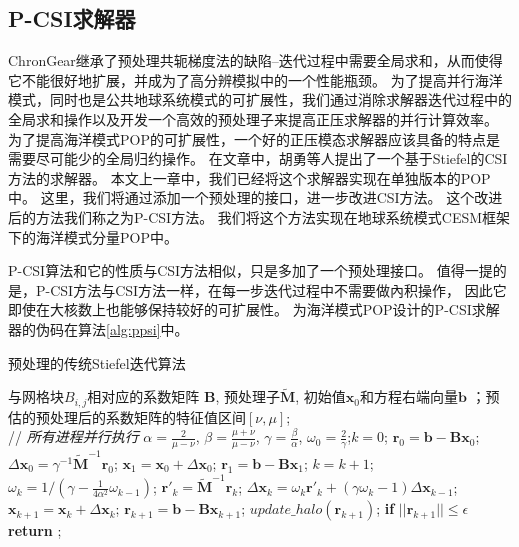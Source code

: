 \subsection{P-CSI求解器}
\label{precond:pcsi}
ChronGear继承了预处理共轭梯度法的缺陷--迭代过程中需要全局求和，从而使得它不能很好地扩展，并成为了高分辨模拟中的一个性能瓶颈。
为了提高并行海洋模式，同时也是公共地球系统模式的可扩展性，我们通过消除求解器迭代过程中的全局求和操作以及开发一个高效的预处理子来提高正压求解器的并行计算效率。
为了提高海洋模式POP的可扩展性，一个好的正压模态求解器应该具备的特点是需要尽可能少的全局归约操作。 
在文章\cite{hu2013scalable}中，胡勇等人提出了一个基于Stiefel的CSI方法的求解器。
本文上一章中，我们已经将这个求解器实现在单独版本的POP中。 
这里，我们将通过添加一个预处理的接口，进一步改进CSI方法。
这个改进后的方法我们称之为P-CSI方法。 我们将这个方法实现在地球系统模式CESM框架下的海洋模式分量POP中。 

P-CSI算法和它的性质与CSI方法相似，只是多加了一个预处理接口。 
值得一提的是，P-CSI方法与CSI方法一样，在每一步迭代过程中不需要做內积操作， 因此它即使在大核数上也能够保持较好的可扩展性。
为海洋模式POP设计的P-CSI求解器的伪码在算法\ref{alg:ppsi}中。

\begin{algorithm}[!t]
\caption{ 预处理的传统Stiefel迭代算法}
\label{alg:ppsi}
\begin{algorithmic}[1]
\REQUIRE 与网格块$B_{i,j}$相对应的系数矩阵 $\textbf{B}$, 预处理子$\tilde{\textbf{M}}$, 初始值$\textbf{x}_0$和方程右端向量$\textbf{b}$ ；预估的预处理后的系数矩阵的特征值区间$[\nu,\mu]$;  \\
 // \qquad    \textit{所有进程并行执行}
\STATE $\alpha =\frac{2}{\mu -\nu}$, $ \beta = \frac{\mu +\nu}{\mu -\nu}$, $\gamma = \frac{\beta}{\alpha}$, $\omega_0 =\frac{ 2}{\gamma}$;\quad $k = 0$;
\STATE $\textbf{r}_0 = \textbf{b}-\textbf{B}\textbf{x}_0$; $\Delta \textbf{x}_{0} = \gamma^{-1}\tilde{\textbf{M}}^{-1}\textbf{r}_0$; $\textbf{x}_1 =\textbf{x}_0 +\Delta \textbf{x}_{0}$; $\textbf{r}_1 =\textbf{b} -\textbf{B}\textbf{x}_1$;
\STATE $k=k+1$;
\STATE $\omega_k = 1/(\gamma - \frac{1}{4\alpha^2}\omega_{k-1})$; 
\STATE $\textbf{r}'_{k} =\tilde{\textbf{M}}^{-1}\textbf{r}_{k}$; \label{alg:ppsi_pre}  
\STATE $\Delta \textbf{x}_{k} =\omega_k\textbf{r}'_{k}+(\gamma \omega_k-1)\Delta \textbf{x}_{k-1}$;
\STATE $\textbf{x}_{k+1} =\textbf{x}_{k}+\Delta \textbf{x}_{k}$;
\STATE $\textbf{r}_{k+1} =\textbf{b}- \textbf{B}\textbf{x}_{k+1}$; 
\STATE $update\_halo(\textbf{r}_{k+1})$; 
\STATE \textbf{if} $||\textbf{r}_{k+1}|| \le \epsilon$  \textbf{return} ;
\ENDIF
\ENDWHILE
\end{algorithmic}
\end{algorithm}

